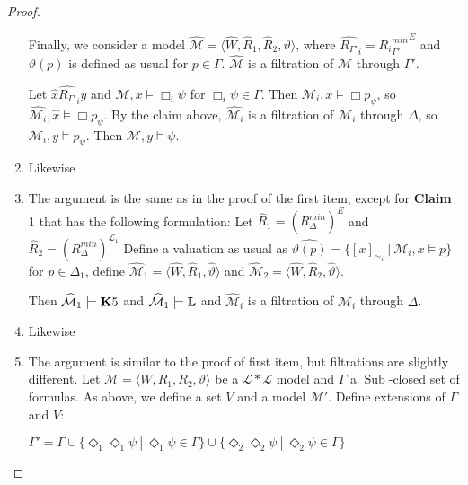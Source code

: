\documentclass[a4paper]{article}
\theoremstyle{defin}
\theoremstyle{theorem}
\theoremstyle{prop}
\theoremstyle{lemma}
\theoremstyle{fact}
\theoremstyle{exercise}
\theoremstyle{ex}
\theoremstyle{col}
\theoremstyle{claim}
\begin{document}
\begin{proof}
\begin{enumerate}
  Finally, we consider a model $\widehat{\mathcal{M}} = \langle \widehat{W}, \widehat{R}_1, \widehat{R}_2, \vartheta \rangle$, where $\widehat{R_{\Gamma'}}_i = {{R_i}^{min}_{\Gamma'}}^E$ and $\vartheta(p)$ is defined as usual for $p \in \Gamma$. $\widehat{\mathcal{M}}$ is a filtration of $\mathcal{M}$ through $\Gamma'$.

  Let $\hat{x} \widehat{R_{\Gamma'}}_i \hat{y}$ and $\mathcal{M}, x \models \Box_i \psi$ for $\Box_i \psi \in \Gamma$. Then $\mathcal{M}_i, x \models \Box p_{\psi}$, so $\widehat{\mathcal{M}_i}, \hat{x} \models \Box p_{\psi}$.
  By the claim above, $\widehat{\mathcal{M}_i}$ is a filtration of $\mathcal{M}_i$ through $\Delta$, so $\mathcal{M}_i, y \models p_{\psi}$. Then $\mathcal{M}, y \models \psi$.

  \item Likewise
  \item The argument is the same as in the proof of the first item, except for {\bf Claim} 1 that has the following formulation:
  Let $\widehat{R}_1 = (R^{min}_{\Delta})^{E}$ and $\widehat{R}_2 = (R^{min}_{\Delta})^{\mathcal{L}_1}$
  Define a valuation as usual as $\widehat{\vartheta(p)} = \{ [x]_{\sim_i} \: | \: \mathcal{M}_i, x \models p \}$ for $p \in \Delta_1$, define $\widehat{\mathcal{M}}_1 = \langle \widehat{W}, \widehat{R}_1, \widehat{\vartheta} \rangle$ and $\widehat{\mathcal{M}}_2 = \langle \widehat{W}, \widehat{R}_2, \widehat{\vartheta} \rangle$.

  Then $\widehat{\mathcal{M}}_1 \models {\bf K}5$ and $\widehat{\mathcal{M}}_1 \models {\bf L}$ and $\widehat{\mathcal{M}}_i$ is a filtration of $\mathcal{M}_i$ through $\Delta$.

  \item Likewise
  \item The argument is similar to the proof of first item, but filtrations are slightly different.
  Let $\mathcal{M} = \langle W, R_1, R_2, \vartheta \rangle$ be a $\mathcal{L} * \mathcal{L}$ model and $\Gamma$ a $\operatorname{Sub}$-closed set of formulas. As above, we define a set $V$ and a model $\mathcal{M}'$. Define extensions of $\Gamma$ and $V$:

  \begin{center}
    $\Gamma' = \Gamma \cup \{ \Diamond_1 \Diamond_1 \psi \: | \: \Diamond_1 \psi \in \Gamma \} \cup \{ \Diamond_2 \Diamond_2 \psi \: | \: \Diamond_2 \psi \in \Gamma \}$


\end{center}
\end{enumerate}
\end{proof}
\end{document}

